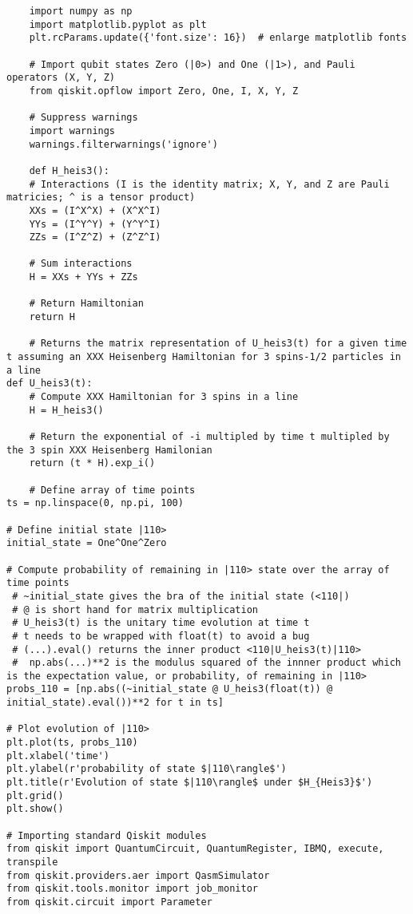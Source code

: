 \begin{verbatim}
    import numpy as np
    import matplotlib.pyplot as plt
    plt.rcParams.update({'font.size': 16})  # enlarge matplotlib fonts
    
    # Import qubit states Zero (|0>) and One (|1>), and Pauli operators (X, Y, Z)
    from qiskit.opflow import Zero, One, I, X, Y, Z
    
    # Suppress warnings
    import warnings
    warnings.filterwarnings('ignore')

    def H_heis3():
    # Interactions (I is the identity matrix; X, Y, and Z are Pauli matricies; ^ is a tensor product)
    XXs = (I^X^X) + (X^X^I)
    YYs = (I^Y^Y) + (Y^Y^I)
    ZZs = (I^Z^Z) + (Z^Z^I)
    
    # Sum interactions
    H = XXs + YYs + ZZs
    
    # Return Hamiltonian
    return H

    # Returns the matrix representation of U_heis3(t) for a given time t assuming an XXX Heisenberg Hamiltonian for 3 spins-1/2 particles in a line
def U_heis3(t):
    # Compute XXX Hamiltonian for 3 spins in a line
    H = H_heis3()
    
    # Return the exponential of -i multipled by time t multipled by the 3 spin XXX Heisenberg Hamilonian 
    return (t * H).exp_i()

    # Define array of time points
ts = np.linspace(0, np.pi, 100)

# Define initial state |110>
initial_state = One^One^Zero

# Compute probability of remaining in |110> state over the array of time points
 # ~initial_state gives the bra of the initial state (<110|)
 # @ is short hand for matrix multiplication
 # U_heis3(t) is the unitary time evolution at time t
 # t needs to be wrapped with float(t) to avoid a bug
 # (...).eval() returns the inner product <110|U_heis3(t)|110>
 #  np.abs(...)**2 is the modulus squared of the innner product which is the expectation value, or probability, of remaining in |110>
probs_110 = [np.abs((~initial_state @ U_heis3(float(t)) @ initial_state).eval())**2 for t in ts]

# Plot evolution of |110>
plt.plot(ts, probs_110)
plt.xlabel('time')
plt.ylabel(r'probability of state $|110\rangle$')
plt.title(r'Evolution of state $|110\rangle$ under $H_{Heis3}$')
plt.grid()
plt.show()

# Importing standard Qiskit modules
from qiskit import QuantumCircuit, QuantumRegister, IBMQ, execute, transpile
from qiskit.providers.aer import QasmSimulator
from qiskit.tools.monitor import job_monitor
from qiskit.circuit import Parameter


\end{verbatim}
